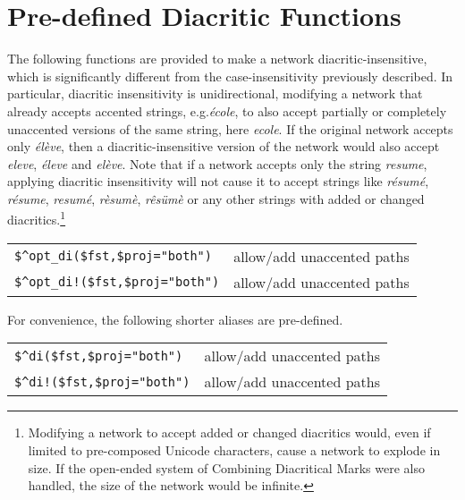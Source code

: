 
\chapter{Pre-defined Diacritic Functions}

The following functions are provided to make a network
diacritic-insensitive, which is significantly different from the
case-insensitivity previously described.  In particular, diacritic
insensitivity is unidirectional, modifying a network that already accepts
accented strings, e.g.\@ \emph{\'ecole}, to also accept partially or
completely unaccented versions of the same string, here \emph{ecole}.  If
the original network accepts only \emph{\'el\`eve}, then a
diacritic-insensitive version of the network would also accept
\emph{eleve}, \emph{\'eleve} and \emph{el\`eve}.  Note that if a network
accepts only the string \emph{resume}, applying diacritic insensitivity
will not cause it to accept strings like \emph{r\'esum\'e},
\emph{r\'esume}, \emph{resum\'e}, \emph{r\`esum\`e}, \emph{r\^es\"um\`e}
or any other strings with added or changed diacritics.\footnote{Modifying
a network to accept added or changed diacritics would, even if limited to
pre-composed Unicode characters, cause a network to explode in size.  If
the open-ended system of Combining Diacritical Marks were also handled,
the size of the network would be infinite.}

\vspace{0.5cm}

\noindent
\begin{tabular}{|l|l|}
\hline
\verb/$^opt_di($fst,/\verb!$proj="both"!\verb!)! & allow/add unaccented paths\\
\verb/$^opt_di!($fst,/\verb!$proj="both"!\verb!)! & allow/add unaccented paths\\
\hline
\end{tabular}

\vspace{0.5cm}

\noindent
For convenience, the following shorter aliases are pre-defined.

\vspace{0.5cm}

\noindent
\begin{tabular}{|l|l|}
\hline
\verb/$^di($fst,/\verb!$proj="both"!\verb!)! & allow/add unaccented paths\\
\verb/$^di!($fst,/\verb!$proj="both"!\verb!)! & allow/add unaccented paths\\
\hline
\end{tabular}

